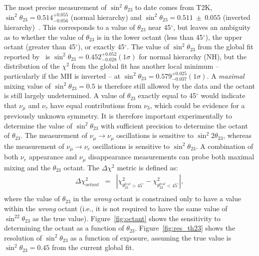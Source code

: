 The most precise measurement of $\sin^2\theta_{23}$ to date comes from
T2K, $\sin^2\theta_{23} = 0.514^{+0.055}_{-0.056}$ (normal hierarchy)
and $\sin^2\theta_{23} = 0.511~\pm~0.055$ (inverted
hierarchy)~\cite{Abe:2015awa}.  This corresponds to a value of
$\theta_{23}$ near 45\mbox{$^{\circ}$}, but leaves an ambiguity as to
whether the value of $\theta_{23}$ is in the lower octant (less than
45\mbox{$^{\circ}$}), the upper octant (greater than
45\mbox{$^{\circ}$}), or exactly 45\mbox{$^{\circ}$}.  The value of
$\sin^2 \theta_{23}$ from the global fit reported
by~\cite{Gonzalez-Garcia:2014bfa} is $\sin ^2 \theta_{23} = 0.452
^{+0.052} _{-0.028} (1 \sigma)$ for normal hierarchy (NH), but the
distribution of the $\chi^2$ from the global fit has another local
minimum -- particularly if the MH is inverted -- at $\sin^2
\theta_{23} = 0.579 ^{+0.025} _{-0.037} (1 \sigma)$. A \emph{maximal}
mixing value of $\sin^2 \theta_{23} =0.5$ is therefore still allowed
by the data and the octant is still largely undetermined.  A value of
$\theta_{23}$ exactly equal to 45\mbox{$^{\circ}$} would indicate that
$\nu_{\mu}$ and $\nu_{\tau}$ have equal contributions from $\nu_3$,
which could be evidence for a previously unknown symmetry.  It is
therefore important experimentally to determine the value of $\sin ^2
\theta_{23}$ with sufficient precision to determine the octant of
$\theta_{23}$.  The measurement of $\nu_\mu \rightarrow \nu_\mu$
oscillations is sensitive to $\sin ^2 2 \theta_{23}$, whereas the
measurement of $\nu_\mu \rightarrow \nu_e$ oscillations is sensitive
to $\sin^2 \theta_{23}$.  A combination of both $\nu_e$ appearance and
$\nu_\mu$ disappearance measurements can probe both maximal mixing and
the $\theta_{23}$ octant.  The $\Delta\chi^2$ metric is defined as:
\begin{eqnarray}
\Delta\chi^2_{octant} & = & |\chi^2_{\theta_{23}^{test}>45^\circ} - \chi^2_{\theta_{23}^{test}<45^\circ}|, \\ \nonumber
\end{eqnarray}
where the value of $\theta_{23}$ in the \emph{wrong} octant is constrained 
only to have a value within the \emph{wrong} octant (i.e., it is not required
to have the same value of $\sin^22\theta_{23}$ as the true value).
Figure~\ref{fig:octant} shows the sensitivity to determining the octant as a function of $\theta_{23}$.  Figure~\ref{fig:res_th23} shows the resolution of $\sin^2\theta_{23}$ as a function of exposure, assuming the true value is $\sin^2\theta_{23} = 0.45$ from the current global fit.

